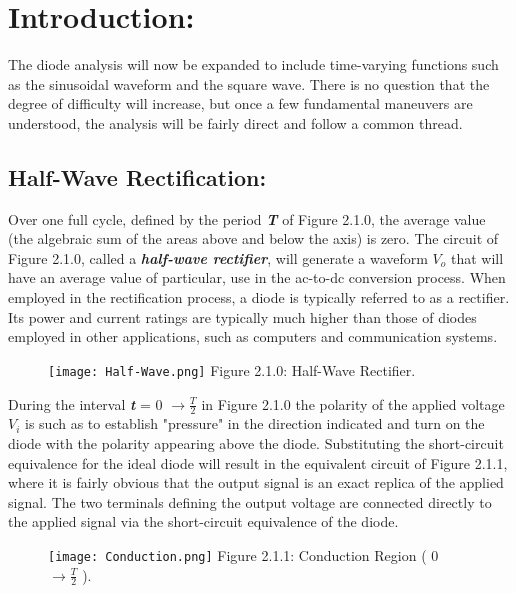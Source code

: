 \section{Introduction:}

The diode analysis will now be expanded to include time-varying functions such as
the sinusoidal waveform and the square wave. There is no question that the degree of
difficulty will increase, but once a few fundamental maneuvers are understood, the
analysis will be fairly direct and follow a common thread.

\subsection{Half-Wave Rectification:}

Over one full cycle, defined by the period {\bfseries\itshape T} of Figure 2.1.0, the average value (the
algebraic sum of the areas above and below the axis) is zero. The circuit of Figure 2.1.0,
called a {\bfseries\itshape half-wave rectifier}, will generate a waveform $V_{o}$ that will have an average
value of particular, use in the ac-to-dc conversion process. When employed in the rectification
process, a diode is typically referred to as a rectifier. Its power and current
ratings are typically much higher than those of diodes employed in other applications,
such as computers and communication systems.

\begin{multicols}{2}
\begin{figure}[H]
\texttt{[image: Half-Wave.png]}
\centering \linebreak \linebreak Figure 2.1.0: Half-Wave Rectifier.
\end{figure}

During the interval {\bfseries\itshape t} = 0 $\rightarrow \frac{T}{2}$ in Figure 2.1.0  the polarity of the applied voltage $V_{i}$ is such as to establish "pressure" in the direction indicated and turn on the diode with
the polarity appearing above the diode. Substituting the short-circuit equivalence for
the ideal diode will result in the equivalent circuit of Figure 2.1.1, where it is fairly obvious
that the output signal is an exact replica of the applied signal. The two terminals
defining the output voltage are connected directly to the applied signal via the
short-circuit equivalence of the diode.
\end{multicols}

\begin{figure}[H]
\texttt{[image: Conduction.png]}
\centering \linebreak \linebreak Figure 2.1.1: Conduction Region ( 0 $\rightarrow \frac{T}{2}$ ).
\end{figure}

